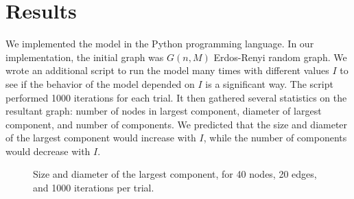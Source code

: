 \documentclass[a4paper,10pt]{article}
\begin{document}
\section{Results}

We implemented the model in the Python programming language. In our implementation, the initial graph was $G(n, M)$ Erdos-Renyi random graph. We wrote an additional script to run the model many times with different values $I$ to see if the behavior of the model depended on $I$ is a significant way. The script performed 1000 iterations for each trial. It then gathered several statistics on the resultant graph: number of nodes in largest component, diameter of largest component, and number of components. We predicted that the size and diameter of the largest component would increase with $I$, while the number of components would decrease with $I$. 

\begin{figure}[H]
\begin{center}
\caption{Size and diameter of the largest component, for 40 nodes, 20 edges, and 1000 iterations per trial.}
\end{center}
\end{figure} 
\end{document}
